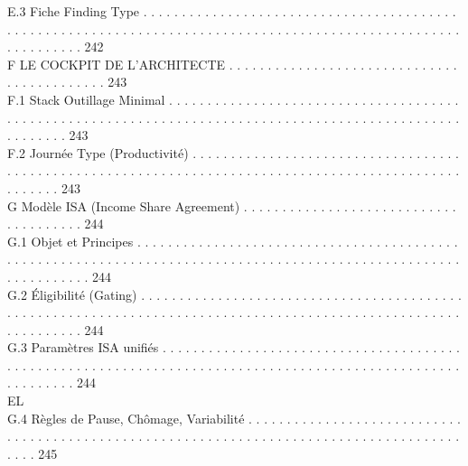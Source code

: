 E.3     Fiche Finding Type . . . . . . . . . . . . . . . . . . . . . . . . . . . . . . . . . . . . . . . . . . . . . . . . . . . . . . . . . . . . . . . . . . . . . . . . . . . . . . . . . . . . . . . . . . . . . . . . . . . . . . . . . . . . . . 242\\
\vspace{0.5em}
F     LE COCKPIT DE L’ARCHITECTE . . . . . . . . . . . . . . . . . . . . . . . . . . . . . . . . . . . . . . . . . . . 243\\
F.1     Stack Outillage Minimal . . . . . . . . . . . . . . . . . . . . . . . . . . . . . . . . . . . . . . . . . . . . . . . . . . . . . . . . . . . . . . . . . . . . . . . . . . . . . . . . . . . . . . . . . . . . . . . . . . . . . . . . . 243\\
F.2     Journée Type (Productivité) . . . . . . . . . . . . . . . . . . . . . . . . . . . . . . . . . . . . . . . . . . . . . . . . . . . . . . . . . . . . . . . . . . . . . . . . . . . . . . . . . . . . . . . . . . . . . . . . . . . . . 243\\
\vspace{0.5em}
G     Modèle ISA (Income Share Agreement) . . . . . . . . . . . . . . . . . . . . . . . . . . . . . . . . . . . . . . 244\\
G.1     Objet et Principes . . . . . . . . . . . . . . . . . . . . . . . . . . . . . . . . . . . . . . . . . . . . . . . . . . . . . . . . . . . . . . . . . . . . . . . . . . . . . . . . . . . . . . . . . . . . . . . . . . . . . . . . . . . . . . . . 244\\
G.2     Éligibilité (Gating) . . . . . . . . . . . . . . . . . . . . . . . . . . . . . . . . . . . . . . . . . . . . . . . . . . . . . . . . . . . . . . . . . . . . . . . . . . . . . . . . . . . . . . . . . . . . . . . . . . . . . . . . . . . . . . . 244\\
G.3     Paramètres ISA unifiés . . . . . . . . . . . . . . . . . . . . . . . . . . . . . . . . . . . . . . . . . . . . . . . . . . . . . . . . . . . . . . . . . . . . . . . . . . . . . . . . . . . . . . . . . . . . . . . . . . . . . . . . . . . 244\\
\vspace{0.5em}
\vspace{0.5em}
\vspace{0.5em}
\vspace{0.5em}
EL\\
G.4     Règles de Pause, Chômage, Variabilité . . . . . . . . . . . . . . . . . . . . . . . . . . . . . . . . . . . . . . . . . . . . . . . . . . . . . . . . . . . . . . . . . . . . . . . . . . . . . . . . . . . . . . . . . . . 245\\
